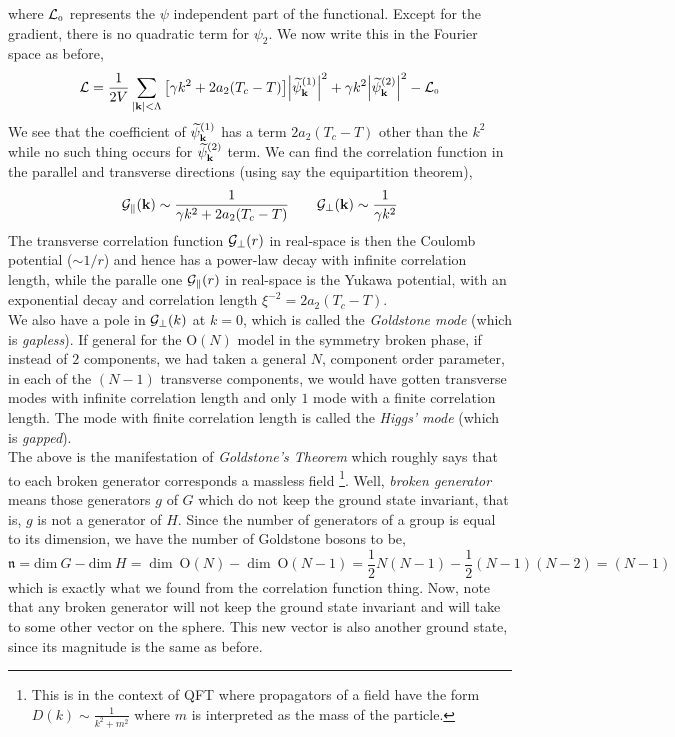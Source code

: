  where $\mathcal L_{\text{\tiny 0}}$ represents the $\psi$ independent part of the functional. Except for the gradient, there is no quadratic term for $\psi_2$. We now write this in the Fourier space as before,
\begin{equation}\label{landaucontsymm}
  \mathcal L = \frac{1}{2V}\sum\limits_{\abs{\vb{k}}<\Lambda} \qty[\gamma k^2 + 2a_2(T_c-T)]\abs{\widetilde{\psi}_{\vb{k}}^{(1)}}^2 + \gamma k^2\abs{\widetilde{\psi}_{\vb{k}}^{(2)}}^2 - \mathcal L_{\text{\tiny 0}}
\end{equation}
We see that the coefficient of $\widetilde{\psi}_{\vb{k}}^{(1)}$ has a term $2a_2(T_c-T)$ other than the $k^2$ while no such thing occurs for $\widetilde{\psi}_{\vb{k}}^{(2)}$ term. We can find the correlation function in the parallel and transverse directions (using say the equipartition theorem),
\begin{equation}
  \mathcal G_{\parallel}(\vb{k}) \sim \frac{1}{\gamma k^2 + 2a_2(T_c-T)} 
  \qquad \mathcal G_{\perp}(\vb{k}) \sim  \frac{1}{\gamma k^2}
\end{equation}
The transverse correlation function $\mathcal G_{\perp}(r)$ in real-space is then the Coulomb potential ($\sim 1/r$) and hence has a power-law decay with infinite correlation length, while the paralle one $\mathcal G_{\parallel}(r)$ in real-space is the Yukawa potential, with an exponential decay and correlation length $\xi^{-2} = 2a_2(T_c-T)$.\\

We also have a pole in $\mathcal G_{\perp}(k)$ at $k=0$, which is called the \textit{Goldstone mode} (which is \textit{gapless}). If general for the $\mathrm{O}(N)$ model in the symmetry broken phase, if instead of $2$ components, we had taken a general $N$, component order parameter, in each of the $(N-1)$ transverse components, we would have gotten transverse modes with infinite correlation length and only $1$ mode with a finite correlation length. The mode with finite correlation length is called the \textit{Higgs' mode} (which is \textit{gapped}). \\

The above is the manifestation of \textit{Goldstone's Theorem} which roughly says that to each broken generator corresponds a massless field \footnote{This is in the context of QFT where propagators of a field have the form $D(k) \sim \frac{1}{k^2+m^2}$ where $m$ is interpreted as the mass of the particle.}. Well, \textit{broken generator} means those generators $g$ of $G$ which do not keep the ground state invariant, that is, $g$ is not a generator of $H$. Since the number of generators of a group is equal to its dimension, we have the number of Goldstone bosons to be, 
$$\mathfrak{n} = \mathrm{dim}\ G - \mathrm{dim}\ H = \dim \ \mathrm{O}(N) - \dim \ \mathrm{O}(N-1) = \frac{1}{2}N(N-1) - \frac{1}{2}(N-1)(N-2)= (N-1)$$
which is exactly what we found from the correlation function thing. Now, note that any broken generator will not keep the ground state invariant and will take to some other vector on the sphere. This new vector is also another ground state, since its magnitude is the same as before.\\

